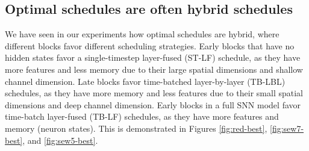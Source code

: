




\subsection*{Optimal schedules are often hybrid schedules}

We have seen in our experiments how optimal schedules are hybrid, where different blocks favor different scheduling strategies. Early blocks that have no hidden states favor a single-timestep layer-fused (ST-LF) schedule, as they have more features and less memory due to their large spatial dimensions and shallow channel dimension. Late blocks favor time-batched layer-by-layer (TB-LBL) schedules, as they have more memory and less features due to their small spatial dimensions and deep channel dimension. Early blocks in a full SNN model favor time-batch layer-fused (TB-LF) schedules, as they have more features and memory (neuron states). This is demonstrated in Figures \ref{fig:red-best}, \ref{fig:sew7-best}, and \ref{fig:sew5-best}.





